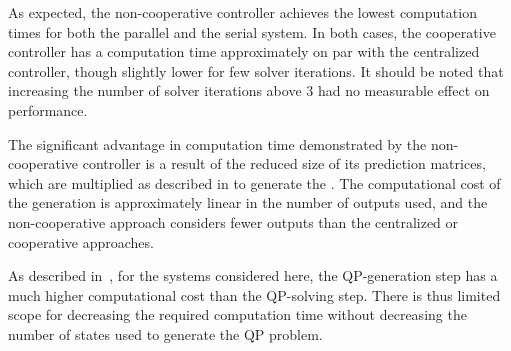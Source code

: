 As expected, the non-cooperative controller achieves the lowest computation times for both the parallel and the serial system.
In both cases, the cooperative controller has a computation time approximately on par with the centralized controller, though slightly lower for few solver iterations.
It should be noted that increasing the number of solver iterations above 3 had no measurable effect on performance.

The significant advantage in computation time demonstrated by the non-cooperative controller is a result of the reduced size of its prediction matrices, which are multiplied as described in  to generate the .
The computational cost of the  generation is approximately linear in the number of outputs used, and the non-cooperative approach considers fewer outputs than the centralized or cooperative approaches.

As described in~\cite{Jones2016}, for the systems considered here, the QP-generation step has a much higher computational cost than the QP-solving step.
There is thus limited scope for decreasing the required computation time without decreasing the number of states used to generate the QP problem.
